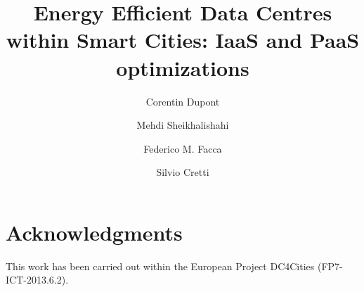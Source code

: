 \documentclass[lnicst]{svmultln}
\begin{document}
%
\mainmatter              %
%
\title{Energy Efficient Data Centres within Smart Cities: IaaS and PaaS optimizations}
%
\author{Corentin Dupont\and Mehdi Sheikhalishahi\and Federico M. Facca \and Silvio Cretti }
%
%
%

\maketitle              %

\begin{abstract}        %


\end{abstract}
%

%





\section*{Acknowledgments}
This work has been carried out within the European Project DC4Cities (FP7-ICT-2013.6.2).



\end{document}
